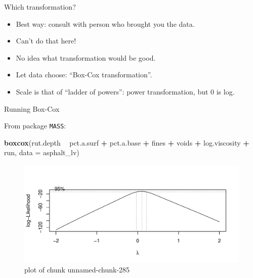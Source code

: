\documentclass[ignorenonframetext,]{beamer}
\newenvironment{Shaded}{\begin{snugshade}}{\end{snugshade}}
\newcommand{\DataTypeTok}[1]{\textcolor[rgb]{0.13,0.29,0.53}{#1}}
\newcommand{\KeywordTok}[1]{\textcolor[rgb]{0.13,0.29,0.53}{\textbf{#1}}}
\newcommand{\NormalTok}[1]{#1}
\newcommand{\OperatorTok}[1]{\textcolor[rgb]{0.81,0.36,0.00}{\textbf{#1}}}
\newcommand{\StringTok}[1]{\textcolor[rgb]{0.31,0.60,0.02}{#1}}
\providecommand{\tightlist}{%
  \setlength{\itemsep}{0pt}\setlength{\parskip}{0pt}}
\begin{document}
\begin{frame}{Which transformation?}
\protect\hypertarget{which-transformation}{}

\begin{itemize}
\tightlist
\item
  Best way: consult with person who brought you the data.
\item
  Can't do that here!
\item
  No idea what transformation would be good.
\item
  Let data choose: ``Box-Cox transformation''.
\item
  Scale is that of ``ladder of powers'': power transformation, but 0 is
  log.
\end{itemize}

\end{frame}

\begin{frame}[fragile]{Running Box-Cox}
\protect\hypertarget{running-box-cox}{}

From package \texttt{MASS}:

\begin{Shaded}
\begin{Highlighting}[]
\KeywordTok{boxcox}\NormalTok{(rut.depth }\OperatorTok{~}\StringTok{ }\NormalTok{pct.a.surf }\OperatorTok{+}\StringTok{ }\NormalTok{pct.a.base }\OperatorTok{+}\StringTok{ }\NormalTok{fines }\OperatorTok{+}\StringTok{ }\NormalTok{voids }\OperatorTok{+}
\StringTok{  }\NormalTok{log.viscosity }\OperatorTok{+}\StringTok{ }\NormalTok{run, }\DataTypeTok{data =}\NormalTok{ asphalt_lv)}
\end{Highlighting}
\end{Shaded}

\begin{figure}
\centering
\includegraphics{figure/unnamed-chunk-285-1.pdf}
\caption{plot of chunk unnamed-chunk-285}
\end{figure}

\end{frame}
\end{document}
